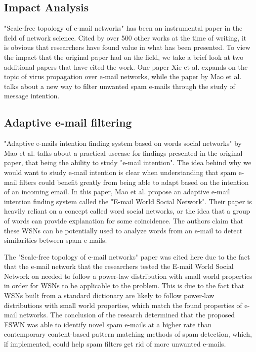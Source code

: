 \documentclass[11pt]{article}
\begin{document}
\begin{multicols}{2}
\section{Impact Analysis}
\hspace*{\parindent}"Scale-free topology of e-mail networks" has been an instrumental paper in the field of network science. Cited by over 500 other works at the time of writing, it is obvious that researchers have found value in what has been presented. To view the impact that the original paper had on the field, we take a brief look at two additional papers that have cited the work. One paper Xie et al. \cite{5} expands on the topic of virus propagation over e-mail networks, while the paper by Mao et al. \cite{4} talks about a new way to filter unwanted spam e-mails through the study of message intention.

\subsection{Adaptive e-mail filtering}
\hspace*{\parindent}"Adaptive e-mails intention finding system based on words social networks" by Mao et al. \cite{4} talks about a practical usecase for findings presented in the original paper, that being the ability to study "e-mail intention". The idea behind why we would want to study e-mail intention is clear when understanding that spam e-mail filters could benefit greatly from being able to adapt based on the intention of an incoming email. In this paper, Mao et al. propose an adaptive e-mail intention finding system called the "E-mail World Social Network". Their paper is heavily reliant on a concept called word social networks, or the idea that a group of words can provide explanation for some coincidence. The authors claim that these WSNs can be potentially used to analyze words from an e-mail to detect similarities between spam e-mails. 

The "Scale-free topology of e-mail networks" paper was cited here due to the fact that the e-mail network that the researchers tested the E-mail World Social Network on needed to follow a power-law distribution with small world properties in order for WSNs to be applicable to the problem. This is due to the fact that WSNs built from a standard dictionary are likely to follow power-law distributions with small world properties, which match the found properties of e-mail networks. The conclusion of the research determined that the proposed ESWN was able to identify novel spam e-mails at a higher rate than contemporary content-based pattern matching methods of spam detection, which, if implemented, could help spam filters get rid of more unwanted e-mails.


\end{multicols}
\end{document}
